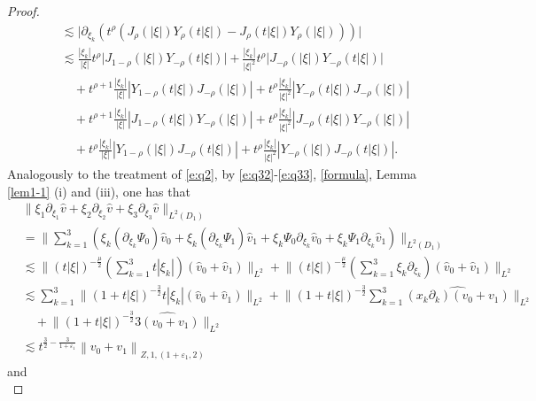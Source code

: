 \documentclass[11pt,twoside]{article}
\newcommand{\p}{\partial}
\newcommand{\f}{\frac}
\theoremstyle{plain}
\theoremstyle{definition}
\theoremstyle{remark}
\numberwithin{equation}{section}
\begin{document}
\begin{proof}
\begin{equation}
\begin{aligned}
& \lesssim  \big| \partial_{\xi_k} \left( t^\rho \left( J_{\rho}(|\xi|) Y_\rho(t|\xi|)
- J_\rho(t|\xi|) Y_{\rho}(|\xi|) \right) \right) \big| \\
& \lesssim  \frac{|\xi_k|}{|\xi|} t^\rho \big| J_{1-\rho}(|\xi|) Y_{-\rho}(t|\xi|) \big|
+ \frac{|\xi_k|}{|\xi|^2} t^\rho \big| J_{-\rho}(|\xi|) Y_{-\rho}(t|\xi|) \big| \\
& \quad + t^{\rho+1}\f{|\xi_k|}{|\xi|} \left| Y_{1-\rho}(t|\xi|)J_{-\rho}(|\xi|) \right|
+ t^\rho \frac{|\xi_k|}{|\xi|^2} \left| Y_{-\rho}(t|\xi|)J_{-\rho}(|\xi|) \right|\\
& \quad + t^{\rho+1}\f{|\xi_k|}{|\xi|} \left| J_{1-\rho}(t|\xi|) Y_{-\rho}(|\xi|) \right|
+ t^\rho \frac{|\xi_k|}{|\xi|^2} \left| J_{-\rho}(t|\xi|) Y_{-\rho}(|\xi|) \right| \\
& \quad + t^\rho \f{|\xi_k|}{|\xi|} \left| Y_{1-\rho}(|\xi|) J_{-\rho}(t|\xi|) \right|
+ t^\rho \frac{|\xi_k|}{|\xi|^2} \left| Y_{-\rho}(|\xi|) J_{-\rho}(t|\xi|) \right|.
\end{aligned}
\end{equation}
Analogously to the treatment of \eqref{e:q2}, by \eqref{e:q32}-\eqref{e:q33}, \eqref{formula},  Lemma \ref{lem1-1} (i) and (iii),
one has that
\begin{equation}\label{e:q34}
\begin{aligned}
&\big\|\xi_1\p_{\xi_1}\hat{v}+\xi_2\p_{\xi_2}\hat{v}+\xi_3\p_{\xi_3}\hat{v}\big\|_{L^2(D_1)}\\
&=\big\|  \sum_{k=1}^{3}\left( \xi_k (\partial_{\xi_k} \Psi_0) \hat{v}_0
+ \xi_k (\partial_{\xi_k} \Psi_1) \hat{v}_1
+ \xi_k \Psi_0 \partial_{\xi_k} \hat{v}_0
+ \xi_k \Psi_1 \partial_{\xi_k} \hat{v}_1\right)\big\|_{L^2(D_1)}\\
&\lesssim \big\|(t|\xi|)^{-\frac{\mu}{2}}(\sum_{k=1}^3t|\xi_k|)(\hat{v}_{0}+\hat{v}_{1})\big\|_{L^{2}}+ \big\|(t|\xi|)^{-\f{\mu}{2}}(\sum_{k=1}^3\xi_k\p_{\xi_k})(\hat{v}_{0}+\hat{v}_{1})\big\|_{L^{2}}\\
& \lesssim \sum_{k=1}^3 \big\|(1+t|\xi|)^{-\f{3}{2}}t|\xi_k|(\hat{v}_{0}+\hat{v}_{1})\big\|_{L^{2}}+
\big\|(1+t|\xi|)^{-\f{3}{2}}\sum_{k=1}^3\widehat{(x_k\p_k)(v_0+v_1)}\big\|_{L^{2}}\\
&\quad+ \big\|(1+t|\xi|)^{-\f{3}{2}}\widehat{3(v_0+v_1)}\big\|_{L^{2}}\\
&\lesssim  t^{\f32-\f{3}{1+\varepsilon_1}}\left\|v_0+v_1\right\|_{Z, 1,(1+\varepsilon_1, 2)}
\end{aligned}
\end{equation}
and
\begin{equation}\label{e:q35}

\end{equation}
\end{proof}
\end{document}
